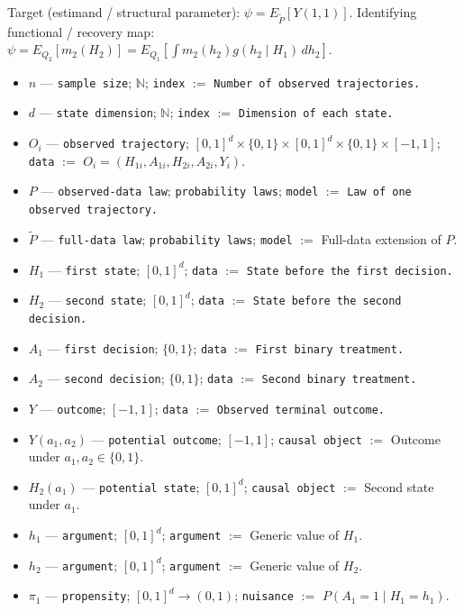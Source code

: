 \documentclass{article}
\begin{document}
Target (estimand / structural parameter): \(\psi=E_{\widetilde P}[Y(1,1)]\).
Identifying functional / recovery map: \(\psi=E_{Q_2}[m_2(H_2)]=E_{Q_1}[\int m_2(h_2)g(h_2\mid H_1)\,dh_2]\).
\begin{itemize}
  \item \(n\) --- \texttt{sample size}; \(\mathbb N\); \texttt{index} $:=$ \texttt{Number of observed trajectories.}
  \item \(d\) --- \texttt{state dimension}; \(\mathbb N\); \texttt{index} $:=$ \texttt{Dimension of each state.}
  \item \(O_i\) --- \texttt{observed trajectory}; \([0,1]^d\times\{0,1\}\times[0,1]^d\times\{0,1\}\times[-1,1]\); \texttt{data} $:=$ \(O_i=(H_{1i},A_{1i},H_{2i},A_{2i},Y_i)\).
  \item \(P\) --- \texttt{observed-data law}; \texttt{probability laws}; \texttt{model} $:=$ \texttt{Law of one observed trajectory.}
  \item \(\widetilde P\) --- \texttt{full-data law}; \texttt{probability laws}; \texttt{model} $:=$ Full-data extension of \(P\).
  \item \(H_1\) --- \texttt{first state}; \([0,1]^d\); \texttt{data} $:=$ \texttt{State before the first decision.}
  \item \(H_2\) --- \texttt{second state}; \([0,1]^d\); \texttt{data} $:=$ \texttt{State before the second decision.}
  \item \(A_1\) --- \texttt{first decision}; \(\{0,1\}\); \texttt{data} $:=$ \texttt{First binary treatment.}
  \item \(A_2\) --- \texttt{second decision}; \(\{0,1\}\); \texttt{data} $:=$ \texttt{Second binary treatment.}
  \item \(Y\) --- \texttt{outcome}; \([-1,1]\); \texttt{data} $:=$ \texttt{Observed terminal outcome.}
  \item \(Y(a_1,a_2)\) --- \texttt{potential outcome}; \([-1,1]\); \texttt{causal object} $:=$ Outcome under \(a_1,a_2\in\{0,1\}\).
  \item \(H_2(a_1)\) --- \texttt{potential state}; \([0,1]^d\); \texttt{causal object} $:=$ Second state under \(a_1\).
  \item \(h_1\) --- \texttt{argument}; \([0,1]^d\); \texttt{argument} $:=$ Generic value of \(H_1\).
  \item \(h_2\) --- \texttt{argument}; \([0,1]^d\); \texttt{argument} $:=$ Generic value of \(H_2\).
  \item \(\pi_1\) --- \texttt{propensity}; \([0,1]^d\to(0,1)\); \texttt{nuisance} $:=$ \(P(A_1=1\mid H_1=h_1)\).

\end{itemize}
\end{document}
